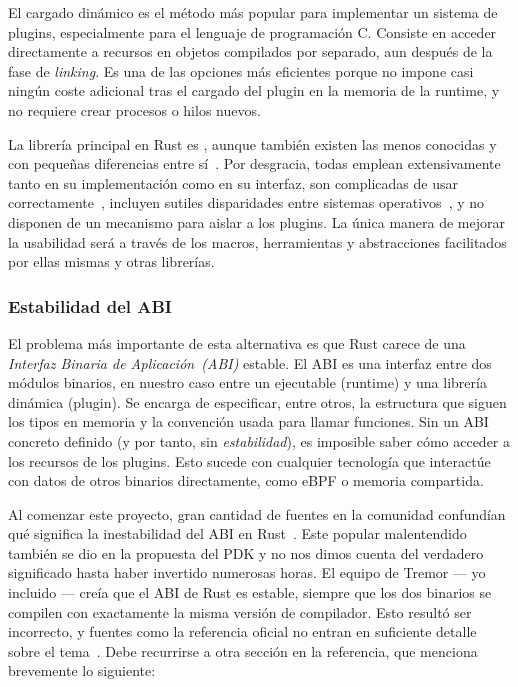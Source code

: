 El cargado dinámico es el método más popular para implementar un sistema de
plugins, especialmente para el lenguaje de programación C. Consiste en acceder
directamente a recursos en objetos compilados por separado, aun después de la
fase de \emph{linking}. Es una de las opciones más eficientes porque no impone
casi ningún coste adicional tras el cargado del plugin en la memoria de la
runtime, y no requiere crear procesos o hilos nuevos.

La librería principal en Rust es , aunque también existen
las menos conocidas  y  con pequeñas
diferencias entre sí~\cite{cratesdynloadcompare}. Por desgracia, todas emplean
\unsafe extensivamente tanto en su implementación como en su interfaz, son
complicadas de usar correctamente~\cite{hardplugins1}\cite{hardplugins2},
incluyen sutiles disparidades entre sistemas operativos~\cite{hardplugins3}, y
no disponen de un mecanismo para aislar a los plugins. La única manera de
mejorar la usabilidad será a través de los macros, herramientas y abstracciones
facilitados por ellas mismas y otras librerías.

\subsubsection{Estabilidad del ABI}\label{sec:abi}

El problema más importante de esta alternativa es que Rust carece de una
\emph{Interfaz Binaria de Aplicación~(ABI)} estable. El ABI es una interfaz
entre dos módulos binarios, en nuestro caso entre un ejecutable (runtime) y una
librería dinámica (plugin). Se encarga de especificar, entre otros, la
estructura que siguen los tipos en memoria y la convención usada para llamar
funciones. Sin un ABI concreto definido (y por tanto, sin \emph{estabilidad}),
es imposible saber cómo acceder a los recursos de los plugins. Esto sucede con
cualquier tecnología que interactúe con datos de otros binarios directamente,
como eBPF o memoria compartida.

Al comenzar este proyecto, gran cantidad de fuentes en la comunidad confundían
qué significa la inestabilidad del ABI en
Rust~\cite{wrongabi1}\cite{wrongabi2}\cite{wrongabi3}\cite{dynloading1}. Este
popular malentendido también se dio en la propuesta del PDK y no nos dimos
cuenta del verdadero significado hasta haber invertido numerosas horas. El
equipo de Tremor --- yo incluido --- creía que el ABI de Rust es estable,
siempre que los dos binarios se compilen con exactamente la misma versión de
compilador. Esto resultó ser incorrecto, y fuentes como la referencia oficial no
entran en suficiente detalle sobre el tema~\cite[Application Binary Interface
(ABI)]{rustref}. Debe recurrirse a otra sección en la referencia, que menciona
brevemente lo siguiente:

